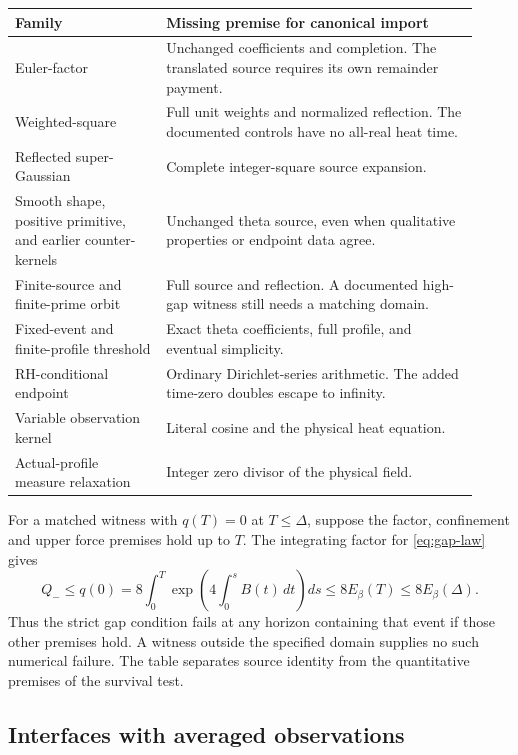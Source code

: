 \begin{center}
\renewcommand{\arraystretch}{1.13}
\begin{tabular}{@{}>{\raggedright\arraybackslash}p{0.30\linewidth}>{\raggedright\arraybackslash}p{0.62\linewidth}@{}}
\hline
Family & Missing premise for canonical import \\
\hline
Euler-factor & Unchanged coefficients and completion. The translated
source requires its own remainder payment. \\
Weighted-square & Full unit weights and normalized reflection.
The documented controls have no all-real heat time. \\
Reflected super-Gaussian & Complete integer-square source expansion. \\
Smooth shape, positive primitive, and earlier counter-kernels
& Unchanged theta source, even when qualitative properties or
endpoint data agree. \\
Finite-source and finite-prime orbit & Full source and reflection.
A documented high-gap witness still needs a matching domain. \\
Fixed-event and finite-profile threshold & Exact theta coefficients,
full profile, and eventual simplicity. \\
RH-conditional endpoint & Ordinary Dirichlet-series arithmetic.
The added time-zero doubles escape to infinity. \\
Variable observation kernel & Literal cosine and the physical heat
equation. \\
Actual-profile measure relaxation & Integer zero divisor of the
physical field. \\
\hline
\end{tabular}
\end{center}

For a matched witness with \(q(T)=0\) at \(T\le\Delta\), suppose the
factor, confinement and upper force premises hold up to \(T\). The
integrating factor for \eqref{eq:gap-law} gives
\[
 Q_-\le q(0)
 = 8\int_0^T \exp\!\left(4\int_0^s B(t)\,dt\right)ds
 \le 8E_\beta(T)\le 8E_\beta(\Delta).
\]
Thus the strict gap condition fails at any horizon containing that
event if those other premises hold. A witness outside the
specified domain supplies no such numerical failure. The table
separates source identity from the quantitative premises of the
survival test.

\subsection{Interfaces with averaged observations}

